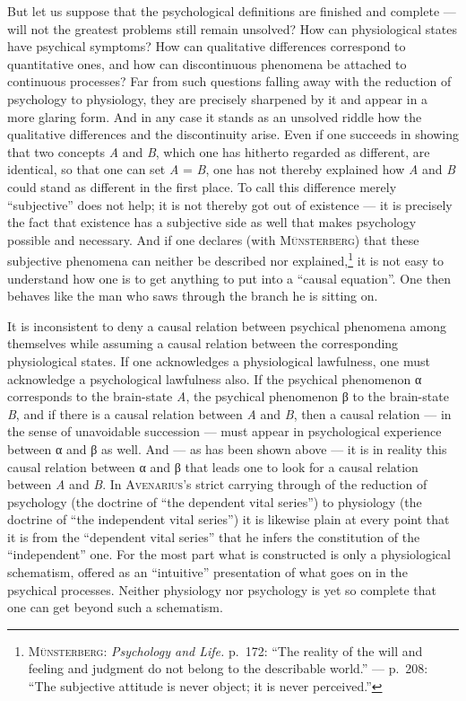 \documentclass[12pt,a4paper]{book}
\newcommand{\opage}[1]{\marginnote{\footnotesize\textit{[#1]}}}
\begin{document}
But let us suppose that the psychological definitions are finished and complete
--- will not the greatest problems still remain unsolved? How can physiological
states have psychical symptoms? How can qualitative differences correspond to
quantitative ones, and how can discontinuous phenomena be attached to continuous
processes? Far from such questions falling away with the reduction of psychology
to physiology, they are precisely sharpened by it and appear in a more glaring
form. And in any case it stands as an unsolved riddle how the qualitative
differences and the discontinuity arise. Even if one succeeds in showing that
two concepts \textit{A} and \textit{B}, which one has hitherto regarded as
different, are identical, so that one can set \textit{A} = \textit{B}, one has
not thereby explained how \textit{A} and \textit{B} could stand as different in
the first place. To call this difference merely ``subjective'' does \opage{18}not help;
it is not thereby got out of existence --- it is precisely the fact that
existence has a subjective side as well that makes psychology possible and
necessary. And if one declares (with \textsc{Münsterberg}) that these subjective
phenomena can neither be described nor explained,\footnote{\textsc{Münsterberg}:
\textit{Psychology and Life.} p.~172: ``The reality of the will and feeling and
judgment do not belong to the describable world.'' --- p.~208: ``The subjective
attitude is never object; it is never perceived.''} it is not easy to understand
how one is to get anything to put into a ``causal equation''. One then behaves
like the man who saws through the branch he is sitting on.

It is inconsistent to deny a causal relation between psychical phenomena among
themselves while assuming a causal relation between the corresponding
physiological states. If one acknowledges a physiological lawfulness, one must
acknowledge a psychological lawfulness also. If the psychical phenomenon α
corresponds to the brain-state \textit{A}, the psychical phenomenon β to the
brain-state \textit{B}, and if there is a causal relation between \textit{A} and
\textit{B}, then a causal relation --- in the sense of unavoidable succession
--- must appear in psychological experience between α and β as well. And --- as
has been shown above --- it is in reality this causal relation between α and β
that leads one to look for a causal relation between \textit{A} and \textit{B}.
In \textsc{Avenarius}'s strict carrying through of the reduction of psychology
(the doctrine of ``the dependent vital series'') to physiology (the doctrine of
``the independent vital series'') it is likewise plain at every point that it is
from the ``dependent vital series'' that he infers the constitution of the
``independent'' one. For the most part what is constructed is only a
physiological schematism, offered as an ``intuitive'' presentation of what goes
on in the psychical processes. Neither physiology nor psychology is yet so
complete that one can get beyond such a schematism.
\end{document}
